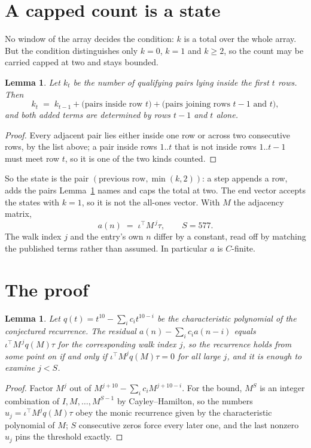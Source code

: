 \documentclass[11pt,a4paper]{article}
\theoremstyle{plain}
\newtheorem{lemma}[theorem]{Lemma}
\theoremstyle{definition}
\begin{document}
\section{A capped count is a state}

No window of the array decides the condition: $k$ is a total over the whole array. But the
condition distinguishes only $k=0$, $k=1$ and $k\ge2$, so the count may be carried capped at
two and stays bounded.

\begin{lemma}\label{lem:cap}
Let $k_t$ be the number of qualifying pairs lying inside the first $t$ rows. Then
\[
k_{t}\;=\;k_{t-1}+\bigl(\text{pairs inside row } t\bigr)
+\bigl(\text{pairs joining rows } t-1 \text{ and } t\bigr),
\]
and both added terms are determined by rows $t-1$ and $t$ alone.
\end{lemma}

\begin{proof}
Every adjacent pair lies either inside one row or across two consecutive rows, by the list
above; a pair inside rows $1..t$ that is not inside rows $1..t-1$ must meet row $t$, so it is
one of the two kinds counted.
\end{proof}

So the state is the pair $(\text{previous row},\min(k,2))$: a step appends a row, adds the
pairs Lemma~\ref{lem:cap} names and caps the total at two. The end vector accepts the states
with $k=1$, so it is not the all-ones vector. With $M$ the adjacency matrix,
\[
a(n)\;=\;\iota^{\!\top}M^{\,j}\tau ,\qquad S=577.
\]
The walk index $j$ and the entry's own $n$ differ by a constant, read off by matching the
published terms rather than assumed. In particular $a$ is $C$-finite.

\section{The proof}

\begin{lemma}\label{lem:crit}
Let $q(t)=t^{10}-\sum_i c_it^{10-i}$ be the characteristic polynomial of the
conjectured recurrence. The residual $a(n)-\sum_ic_ia(n-i)$ equals
$\iota^{\!\top}M^{\,j}q(M)\tau$ for the corresponding walk index $j$, so the recurrence
holds from some point on if and only if $\iota^{\!\top}M^{j}q(M)\tau=0$ for all large $j$,
and it is enough to examine $j<S$.
\end{lemma}

\begin{proof}
Factor $M^{j}$ out of $M^{j+10}-\sum_ic_iM^{j+10-i}$. For the bound, $M^{S}$
is an integer combination of $I,M,\dots,M^{S-1}$ by Cayley--Hamilton, so the numbers
$u_j=\iota^{\!\top}M^{j}q(M)\tau$ obey the monic recurrence given by the characteristic
polynomial of $M$; $S$ consecutive zeros force every later one, and the last nonzero $u_j$
pins the threshold exactly.
\end{proof}
\end{document}
